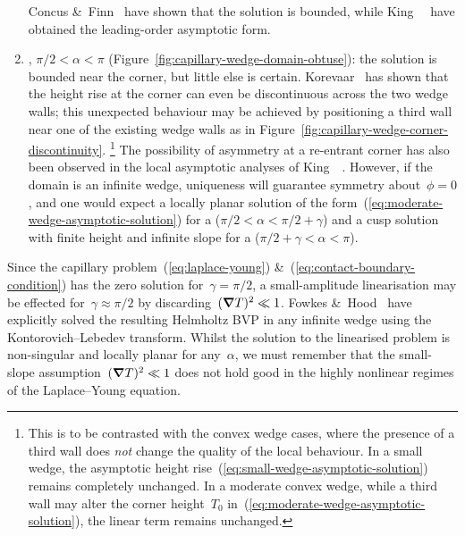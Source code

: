 \begin{enumerate}
    Concus \&~Finn~\cite{concus-1969-behavior-capillary-surface-wedge}
    have shown that the solution is bounded,
    while King~\etal~\cite{king-1999-laplace-young-near-corner}
    have obtained the leading-order asymptotic form.
  \item
    , $\pi/2 < \alpha < \pi$
    (Figure~\ref{fig:capillary-wedge-domain-obtuse}):
    the solution is bounded near the corner,
    but little else is certain.
    Korevaar~\cite{korevaar-1980-capillary-re-entrant-corner}
    has shown that the height rise at the corner
    can even be discontinuous across the two wedge walls;
    this unexpected behaviour may be achieved
    by positioning a third wall near one of the existing wedge walls
    as in Figure~\ref{fig:capillary-wedge-corner-discontinuity}.%
    \footnote{
      This is to be contrasted with the convex wedge cases,
      where the presence of a third wall
      does \emph{not} change the quality of the local behaviour.
      In a small wedge,
      the asymptotic height rise~(\ref{eq:small-wedge-asymptotic-solution})
      remains completely unchanged.
      In a moderate convex wedge,
      while a third wall may alter the corner height~$T_0$
      in~(\ref{eq:moderate-wedge-asymptotic-solution}),
      the linear term remains unchanged.
    }
    The possibility of asymmetry at a re-entrant corner
    has also been observed
    in the local asymptotic analyses
    of King~\etal~\cite{king-1999-laplace-young-near-corner}.
    However, if the domain is an infinite wedge,
    uniqueness will guarantee symmetry about~$\phi = 0$,
    and one would expect a locally planar solution
    of the form~(\ref{eq:moderate-wedge-asymptotic-solution})
    for a  ($\pi/2 < \alpha < \pi/2 + \gamma$)
    and a cusp solution with finite height and infinite slope
    for a  ($\pi/2 + \gamma < \alpha < \pi$).
\end{enumerate}
Since the capillary problem~(\ref{eq:laplace-young})
\&~(\ref{eq:contact-boundary-condition})
has the zero solution for~$\gamma = \pi/2$,
a small-amplitude linearisation may be effected for~$\gamma \approx \pi/2$
by discarding~$(\mathop{}\!\boldsymbol{\mathbf{\nabla}} T)^2 \ll 1$.
Fowkes \&~Hood~\cite{fowkes-1998-surface-tension-effects-wedge}
have explicitly solved the resulting Helmholtz BVP
in any infinite wedge
using the Kontorovich--Lebedev transform.
Whilst the solution to the linearised problem is non-singular
and locally planar for any~$\alpha$,
we must remember that the small-slope assumption~$(\mathop{}\!\boldsymbol{\mathbf{\nabla}} T)^2 \ll 1$
does not hold good
in the highly nonlinear regimes of the Laplace--Young equation.

